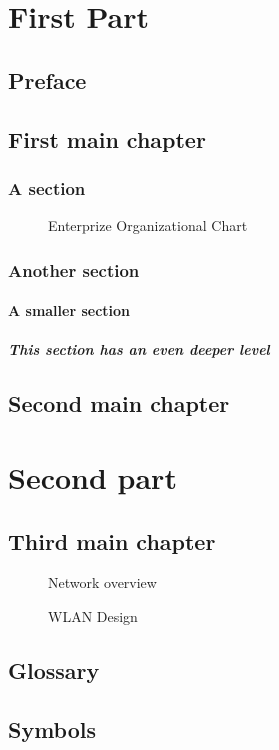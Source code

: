 \documentclass{book}
\begin{document}
\tableofcontents
\listoffigures
\part{First Part}
\chapter*{Preface}
\chapter{First main chapter}
\section{A section}
\begin{figure}
\centering
{}
\caption{Enterprize Organizational Chart}
\end{figure}
\section{Another section}
\subsection{A smaller section}
\subsubsection[Deeper level]{This section has an even deeper
level}
\chapter{Second main chapter}
\part{Second part}
\chapter{Third main chapter}
\begin{figure}
\centering
{}
\caption{Network overview}
\end{figure}
\begin{figure}
\centering
{}
\caption{WLAN Design}
\end{figure}
\appendix
\cleardoublepage
{}
\chapter{Glossary}
\chapter{Symbols}
\end{document}
